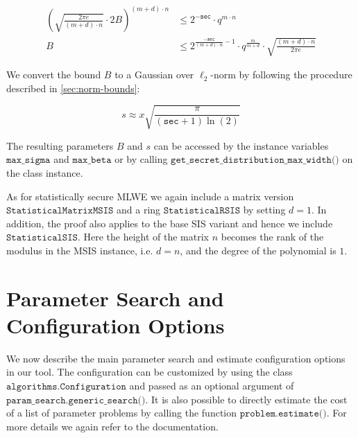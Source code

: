 
\begin{align}
    \left(\sqrt{\frac{2 \pi e}{(m+d) \cdot n}} \cdot 2 B\right)^{(m+d) \cdot n} & \leq 2^{-\texttt{sec}} \cdot q^{m\cdot n}                                                                       \\
    B                                                                           & \leq 2^{\frac{-\texttt{sec}}{(m+d)\cdot n} - 1} \cdot q^\frac{m}{m+d} \cdot \sqrt{\frac{(m+d)\cdot n}{2 \pi e}}
\end{align}

We convert the bound $B$ to a Gaussian over $\ell_2$-norm by following the procedure described in \cref{sec:norm-bounds}: %

\begin{equation}
    s  \approx x \sqrt{\frac{\pi}{(\texttt{sec} + 1) \ln(2)}}
\end{equation}

The resulting parameters $B$ and $s$ can be accessed by the instance variables $\texttt{max\_sigma}$ and $\texttt{max\_beta}$ or by calling $\texttt{get\_secret\_distribution\_max\_width()}$ on the class instance.

As for statistically secure MLWE we again include a matrix version $\texttt{StatisticalMatrixMSIS}$ and a ring $\texttt{StatisticalRSIS}$ by setting $d=1$. In addition, the proof also applies to the base SIS variant and hence we include $\texttt{StatisticalSIS}$. Here the height of the matrix $n$ becomes the rank of the modulus in the MSIS instance, i.e. $d=n$, and the degree of the polynomial is $1$.




\section{Parameter Search and Configuration Options}
We now describe the main parameter search and estimate configuration options in our tool. The configuration can be customized by using the class $\texttt{algorithms.Configuration}$ and passed as an optional argument of $\texttt{param\_search.generic\_search()}$. It is also possible to directly estimate the cost of a list of parameter problems by calling the function $\texttt{problem.estimate()}$. For more details we again refer to the documentation.

